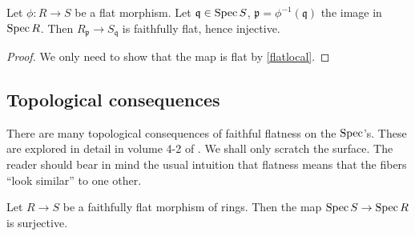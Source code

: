 \begin{corollary} 
Let $\phi: R \to S$ be a flat morphism. Let $\mathfrak{q} \in \operatorname{Spec} S$,
$\mathfrak{p} = \phi^{-1}(\mathfrak{q})$ the image in $\operatorname{Spec} R$. Then 
$R_{\mathfrak{p}} \to S_{\mathfrak{q}}$ is faithfully flat, hence injective.
\end{corollary} 
\begin{proof} 
We only need to show that the map is flat by \cref{flatlocal}. 

\end{proof} 

\subsection{Topological consequences}

There are many topological consequences of faithful flatness on the $\operatorname{Spec}$'s.
These are
explored in detail in volume 4-2 of \cite{EGA}. We shall only scratch the
surface.
The reader 
should bear in mind the usual intuition that flatness means that the fibers
``look similar'' to one other. 

\begin{proposition} 
Let $R \to S$ be a faithfully flat morphism of rings. Then the map $\operatorname{Spec} S
\to \operatorname{Spec} R$ is surjective.
\end{proposition} 

